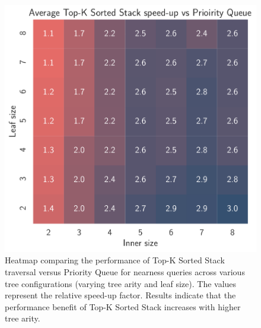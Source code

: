 \begin{figure}[!t]
  \includegraphics[width=\linewidth]{../figures/ftime-matrix.pdf}
\caption{
    Heatmap comparing the performance of Top-K Sorted Stack
    traversal versus Priority Queue for nearness queries across
    various tree configurations (varying tree arity and leaf size).
    The values represent the relative speed-up factor. Results
    indicate that the performance benefit of Top-K Sorted Stack
    increases with higher tree arity.}
  \label{fig:ftime-matrix}
\end{figure}
